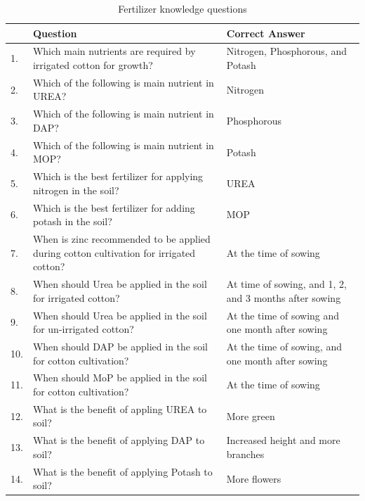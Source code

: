 \documentclass{article}
\begin{document}
\begin{table}[!htb] \centering \caption{Fertilizer knowledge questions} \label{t:knowledge-questions}
\begin{tabularx}{\linewidth}{lXX}
\hline \hline 
 & Question & Correct Answer \\
\hline
1. & Which main nutrients are required by irrigated cotton for growth? & Nitrogen, Phosphorous, and Potash \\ [1em]
2. & Which of the following is main nutrient in UREA? & Nitrogen \\ [1em]
3. & Which of the following is main nutrient in DAP? & Phosphorous \\ [1em]
4. & Which of the following is main nutrient in MOP? & Potash \\ [1em]
5. & Which is the best fertilizer for applying nitrogen in the soil? & UREA \\ [1em]
6. & Which is the best fertilizer for adding potash in the soil? & MOP \\ [1em]
7. & When is zinc recommended to be applied during cotton cultivation for irrigated cotton? & At the time of sowing \\ [1em]
8. & When should Urea be applied in the soil for irrigated cotton? & At time of sowing, and 1, 2, and 3 months after sowing \\ [1em]
9. & When should Urea be applied in the soil for un-irrigated cotton? & At the time of sowing and one month after sowing \\ [1em]
10. & When should DAP be applied in the soil for cotton cultivation? & At the time of sowing, and one month after sowing \\ [1em]
11. & When should MoP be applied in the soil for cotton cultivation? & At the time of sowing \\ [1em]
12. & What is the benefit of appling UREA to soil? & More green \\ [1em]
13. & What is the benefit of applying DAP to soil? & Increased height and more branches \\ [1em]
14. & What is the benefit of applying Potash to soil? & More flowers \\ 
\hline
\end{tabularx}
\end{table}

\FloatBarrier

\pagebreak
\clearpage

\FloatBarrier
\end{document}
